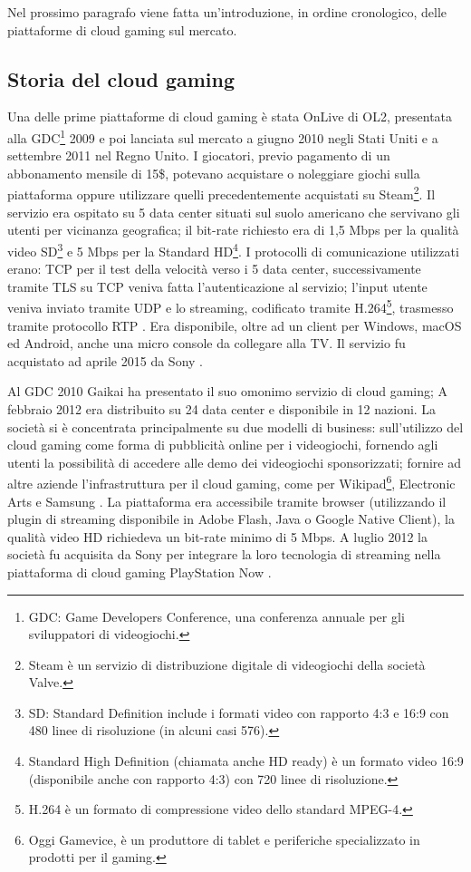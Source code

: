 Nel prossimo paragrafo viene fatta un'introduzione, in ordine cronologico, delle piattaforme di cloud gaming sul mercato.

\subsection{Storia del cloud gaming} \label{StoriaDelCloudGaming}
Una delle prime piattaforme di cloud gaming è stata OnLive di OL2, presentata alla GDC\footnote{GDC: Game Developers Conference, una conferenza annuale per gli sviluppatori di videogiochi.} 2009 e poi lanciata sul mercato a giugno 2010 negli Stati Uniti e a settembre 2011 nel Regno Unito. I giocatori, previo pagamento di un abbonamento mensile di 15\$, potevano acquistare o noleggiare giochi sulla piattaforma oppure utilizzare quelli precedentemente acquistati su Steam\footnote{Steam è un servizio di distribuzione digitale di videogiochi della società Valve.}. Il servizio era ospitato su 5 data center situati sul suolo americano che servivano gli utenti per vicinanza geografica; il bit-rate richiesto era di 1,5 Mbps per la qualità video SD\footnote{SD: Standard Definition include i formati video con rapporto 4:3 e 16:9 con 480 linee di risoluzione (in alcuni casi 576).} e 5 Mbps per la Standard HD\footnote{Standard High Definition (chiamata anche HD ready) è un formato video 16:9 (disponibile anche con rapporto 4:3) con 720 linee di risoluzione.}. I protocolli di comunicazione utilizzati erano: TCP per il test della velocità verso i 5 data center, successivamente tramite TLS su TCP veniva fatta l'autenticazione al servizio; l'input utente veniva inviato tramite UDP e lo streaming, codificato tramite H.264\footnote{H.264 è un formato di compressione video dello standard MPEG-4.}, trasmesso tramite protocollo RTP \parencite{Dissecting_the_protocol_and_network_traffic_of_the_OnLive_cloud_gaming_platform}. Era disponibile, oltre ad un client per Windows, macOS ed Android, anche una micro console da collegare alla TV. Il servizio fu acquistato ad aprile 2015 da Sony \parencite{Cloud_gaming_history}.

Al GDC 2010 Gaikai ha presentato il suo omonimo servizio di cloud gaming; A febbraio 2012 era distribuito su 24 data center e disponibile in 12 nazioni. La società si è concentrata principalmente su due modelli di business: sull'utilizzo del cloud gaming come forma di pubblicità online per i videogiochi, fornendo agli utenti la possibilità di accedere alle demo dei videogiochi sponsorizzati; fornire ad altre aziende l'infrastruttura per il cloud gaming, come per Wikipad\footnote{Oggi Gamevice, è un produttore di tablet e periferiche specializzato in prodotti per il gaming.}, Electronic Arts e Samsung \parencite{Gaikai_open_platform}. La piattaforma era accessibile tramite browser (utilizzando il plugin di streaming disponibile in Adobe Flash, Java o Google Native Client), la qualità video HD richiedeva un bit-rate minimo di 5 Mbps. A luglio 2012 la società fu acquisita da Sony per integrare la loro tecnologia di streaming nella piattaforma di cloud gaming PlayStation Now \parencite{Gaikai_Beta}.

